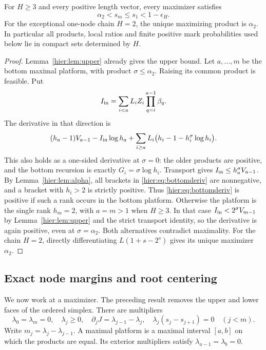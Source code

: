 \begin{theorem}\label{hier:thm:compact}
For $H\ge3$ and every positive length vector, every maximizer satisfies
\begin{equation}
 \alpha_2<s_m\le s_1<1-\epsilon_H. \label{hier:eq:compact}
\end{equation}
For the exceptional one-node chain $H=2$, the unique maximizing
product is $\alpha_2$. In particular all products, local ratios and
finite positive mark probabilities used below lie in compact sets
determined by $H$.
\end{theorem}
\begin{proof}
Lemma~\ref{hier:lem:upper} already gives the upper bound. Let $a,\ldots,m$
be the bottom maximal platform, with product $\sigma\le\alpha_2$.
Raising its common product is feasible. Put
\[
 I_{\rm in}=\sum_{i<a}L_iZ_i\prod_{q=i}^{a-1}\beta_q.
\]
The derivative in that direction is
\begin{equation}
 (h_a-1)V_{a-1}-I_{\rm in}\log h_a
 +\sum_{i\ge a}L_i\bigl(h_i-1-h_i^\sigma\log h_i\bigr).
 \label{hier:eq:bottomderiv}
\end{equation}
This also holds as a one-sided derivative at $\sigma=0$: the older
products are positive, and the bottom recursion is exactly
$G_i=\sigma\log h_i$. Transport gives
$I_{\rm in}\le h_a^\sigma V_{a-1}$. By
Lemma~\ref{hier:lem:alpha}, all brackets in \eqref{hier:eq:bottomderiv} are
nonnegative, and a bracket with $h_i>2$ is strictly positive.
Thus \eqref{hier:eq:bottomderiv} is positive if such a rank occurs in
the bottom platform. Otherwise the platform is the single rank
$h_m=2$, with $a=m>1$ when $H\ge3$. In that case
$I_{\rm in}<2^\sigma V_{m-1}$ by Lemma~\ref{hier:lem:upper} and the
strict transport identity, so the derivative is again positive,
even at $\sigma=\alpha_2$. Both alternatives contradict maximality.
For the chain $H=2$, directly differentiating
$L(1+s-2^s)$ gives its unique maximizer $\alpha_2$.
\end{proof}

\subsection{Exact node margins and root centering}

We now work at a maximizer. The preceding result removes the upper
and lower faces of the ordered simplex. There are multipliers
\begin{equation}
 \lambda_0=\lambda_m=0,\quad \lambda_j\ge0,\quad
 \partial_jJ=\lambda_{j-1}-\lambda_j,\quad
 \lambda_j(s_j-s_{j+1})=0\quad(j<m).
 \label{hier:eq:KKT}
\end{equation}
Write $m_j=\lambda_j-\lambda_{j-1}$. A maximal platform is a
maximal interval $[a,b]$ on which the products are equal. Its exterior
multipliers satisfy $\lambda_{a-1}=\lambda_b=0$.

